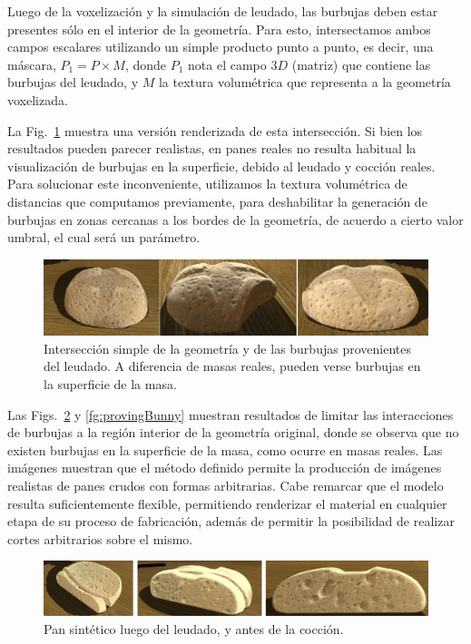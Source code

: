 Luego de la voxelización y la simulación de leudado, las burbujas deben estar presentes sólo en el interior de la geometría.
Para esto, intersectamos ambos campos escalares utilizando un simple producto punto a punto, es decir, una máscara, $P_{1} = P \times M$, donde $P_{1}$ nota el campo $3D$ (matriz) que contiene las burbujas del leudado, y $M$ la textura volumétrica que representa a la geometría voxelizada.

La Fig.~\ref{fg:intersectProblem} muestra una versión renderizada de esta intersección.
Si bien los resultados pueden parecer realistas, en panes reales no resulta habitual la visualización de burbujas en la superficie, debido al leudado y cocción reales.
Para solucionar este inconveniente, utilizamos la textura volumétrica de distancias que computamos previamente, para deshabilitar la generación de burbujas en zonas cercanas a los bordes de la geometría, de acuerdo a cierto valor umbral, el cual será un parámetro.


\begin{figure}
\includegraphics[width=13cm]{figures/intersectProblem}
\caption[Intersección simple de la geometría y de las burbujas provenientes del leudado]{Intersección simple de la geometría y de las burbujas provenientes del leudado. A diferencia de masas reales, pueden verse burbujas en la superficie de la masa.}
\label{fg:intersectProblem}
\end{figure}


Las Figs.~\ref{fg:proving} y \ref{fg:provingBunny} muestran resultados de limitar las interacciones de burbujas a la región interior de la geometría original, donde se observa que no existen burbujas en la superficie de la masa, como ocurre en masas reales.
Las imágenes muestran que el método definido permite la producción de imágenes realistas de panes crudos con formas arbitrarias.
Cabe remarcar que el modelo resulta suficientemente flexible, permitiendo renderizar el material en cualquier etapa de su proceso de fabricación, además de permitir la posibilidad de realizar cortes arbitrarios sobre el mismo.

\begin{figure}
\includegraphics[width=13cm]{figures/prebakebread}
\caption{Pan sintético luego del leudado, y antes de la cocción.}
\label{fg:proving}
\end{figure}

